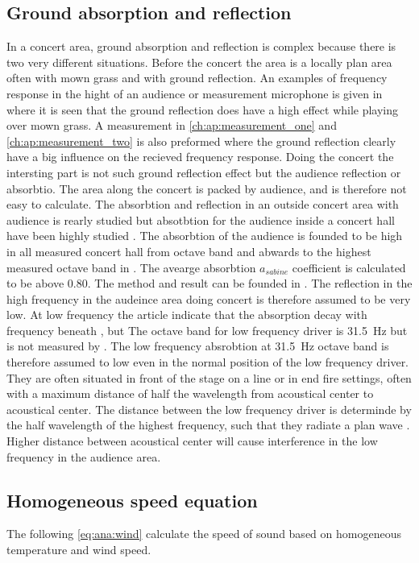\subsection{Ground absorption and reflection} 
In a concert area, ground absorption and reflection is complex because there is two very different situations. Before the concert the area is a locally plan area often with mown grass and with ground reflection.  An examples of frequency response in the hight of an audience or measurement microphone is given in \citep{review_of_sound} where it is seen that the ground reflection does have a high effect while playing over mown grass. A measurement in \autoref{ch:ap:measurement_one} and \autoref{ch:ap:measurement_two} is also preformed where the ground reflection clearly have a big influence on the recieved frequency response. Doing the concert the intersting part is not such ground reflection effect but the audience reflection or absorbtio.  The area along the concert is packed by audience, and is therefore not easy to calculate. The absorbtion and reflection in an outside concert area with audience is rearly studied but absotbtion for the audience inside a concert hall have been highly studied \citep{audience_abso}. The absorbtion of the audience is founded to be high in all measured concert hall from  octave band and abwards to the highest measured octave band in \citep{audience_abso}. The avearge absorbtion $a_{sabine}$ coefficient is calculated to be above 0.80. The method and result can be founded in \citep{audience_abso}. The reflection in the high frequency in the audeince area doing concert is therefore assumed to be very low. At low frequency the article \citep{audience_abso} indicate that the absorption decay with frequency beneath  , but The octave band for low frequency driver is \SI{31.5}{\hertz} but is not measured by \citep{audience_abso}. The low frequency absrobtion at \SI{31.5}{\hertz} octave band is therefore assumed to low even in the normal position of the low frequency driver. They are often situated in front of the stage on a line or in end fire settings, often with a maximum distance of half the wavelength from acoustical center to acoustical center. The distance between the low frequency driver is determinde by the half wavelength of the highest frequency, such that they radiate a plan wave \citep{bauman2001wavefront}. Higher distance between acoustical center will cause interference in the low frequency in the audience area. 



 
 \subsection{Homogeneous speed equation}\label{sec:ana:inhom_ats_con}
 The following \autoref{eq:ana:wind} calculate the speed of sound based on homogeneous temperature and wind speed.

